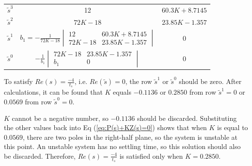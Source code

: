 \begin{questions}
\begin{solution}
   \begin{center}
   \begin{tabular}{c | c c}
   $\tilde{s}^3$ & 12 & $60.3K+8.7145$ \\
   $\tilde{s}^2$ & $72K-18$ & $23.85K-1.357$ \\
   $\tilde{s}^1$ & $b_1 = -\frac{1}{72K-18}\begin{vmatrix}12&60.3K+8.7145\\72K-18& 23.85K-1.357\end{vmatrix}$ & 0 \\
   $\tilde{s}^0$ & $-\frac{1}{b_1}\begin{vmatrix}72K-18&23.85K-1.357\\b_1&0\end{vmatrix}$ & 0
   \end{tabular}
   \end{center}

   To satisfy $Re(s)=\frac{-4}{t_s}$, i.e. $Re(\tilde{s})=0$, the row $\tilde{s}^1$ or $\tilde{s}^0$ should be zero. After calculations, it can be found that $K$ equals $-0.1136$ or $0.2850$ from row $\tilde{s}^1 = 0$ or $0.0569$ from row $\tilde{s}^0 = 0$.

   $K$ cannot be a negative number, so $-0.1136$ should be discarded. Substituting the other values back into Eq (\ref{eq:P(s)+KZ(s)=0}) shows that when $K$ is equal to $0.0569$, there are two poles in the right-half plane, so the system is unstable at this point. An unstable system has no settling time, so this solution should also be discarded. Therefore, $Re(s) = \frac{-4}{t_s}$ is satisfied only when $K=0.2850$.

\end{solution}

\setcounter{lastquestioncounter}{\value{question}}
\end{questions}
